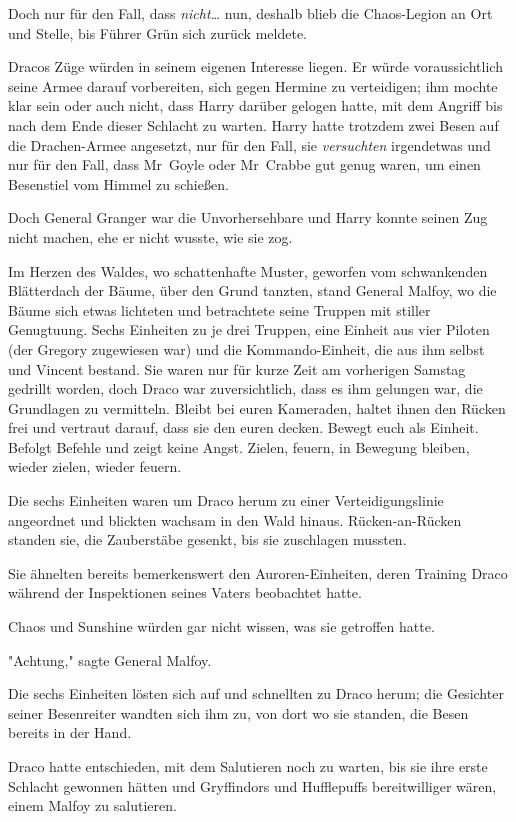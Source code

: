 {Doch nur für den Fall, dass \emph{nicht…} nun, deshalb blieb die Chaos-Legion an Ort und Stelle, bis Führer Grün sich zurück meldete.

Dracos Züge würden in seinem eigenen Interesse liegen. Er würde voraussichtlich seine Armee darauf vorbereiten, sich gegen Hermine zu verteidigen; ihm mochte klar sein oder auch nicht, dass Harry darüber gelogen hatte, mit dem Angriff bis nach dem Ende dieser Schlacht zu warten. Harry hatte trotzdem zwei Besen auf die Drachen-Armee angesetzt, nur für den Fall, sie \emph{versuchten} irgendetwas und nur für den Fall, dass Mr~Goyle oder Mr~Crabbe gut genug waren, um einen Besenstiel vom Himmel zu schießen.

Doch General Granger war die Unvorhersehbare und Harry konnte seinen Zug nicht machen, ehe er nicht wusste, wie sie zog.

\later

Im Herzen des Waldes, wo schattenhafte Muster, geworfen vom schwankenden Blätterdach der Bäume, über den Grund tanzten, stand General Malfoy, wo die Bäume sich etwas lichteten und betrachtete seine Truppen mit stiller Genugtuung. Sechs Einheiten zu je drei Truppen, eine Einheit aus vier Piloten (der Gregory zugewiesen war) und die Kommando-Einheit, die aus ihm selbst und Vincent bestand. Sie waren nur für kurze Zeit am vorherigen Samstag gedrillt worden, doch Draco war zuversichtlich, dass es ihm gelungen war, die Grundlagen zu vermitteln. Bleibt bei euren Kameraden, haltet ihnen den Rücken frei und vertraut darauf, dass sie den euren decken. Bewegt euch als Einheit. Befolgt Befehle und zeigt keine Angst. Zielen, feuern, in Bewegung bleiben, wieder zielen, wieder feuern.

Die sechs Einheiten waren um Draco herum zu einer Verteidigungslinie angeordnet und blickten wachsam in den Wald hinaus. Rücken-an-Rücken standen sie, die Zauberstäbe gesenkt, bis sie zuschlagen mussten.

Sie ähnelten bereits bemerkenswert den Auroren-Einheiten, deren Training Draco während der Inspektionen seines Vaters beobachtet hatte.

Chaos und Sunshine würden gar nicht wissen, was sie getroffen hatte.

"Achtung," sagte General Malfoy.

Die sechs Einheiten lösten sich auf und schnellten zu Draco herum; die Gesichter seiner Besenreiter wandten sich ihm zu, von dort wo sie standen, die Besen bereits in der Hand.

Draco hatte entschieden, mit dem Salutieren noch zu warten, bis sie ihre erste Schlacht gewonnen hätten und Gryffindors und Hufflepuffs bereitwilliger wären, einem Malfoy zu salutieren.

}
